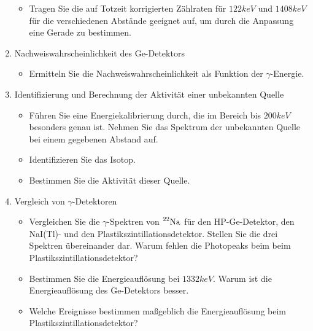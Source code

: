 \begin{enumerate}
\begin{itemize}
				\item Tragen Sie die auf Totzeit korrigierten Zählraten für $122\unit{keV}$ und $1408\unit{keV}$ für die verschiedenen Abstände geeignet auf, um durch die Anpassung eine Gerade zu bestimmen.
			\end{itemize}
		\item Nachweiswahrscheinlichkeit des Ge-Detektors
			\begin{itemize}
				\item Ermitteln Sie die Nachweiswahrscheinlichkeit als Funktion der $\gamma$-Energie.
			\end{itemize}
		\item Identifizierung und Berechnung der Aktivität einer unbekannten Quelle
			\begin{itemize}
				\item Führen Sie eine Energiekalibrierung durch, die im Bereich bis $200\unit{keV}$ besonders genau ist.
				Nehmen Sie das Spektrum der unbekannten Quelle bei einem gegebenen Abstand auf.
				\item Identifizieren Sie das Isotop.
				\item Bestimmen Sie die Aktivität dieser Quelle.
			\end{itemize}
		\item Vergleich von $\gamma$-Detektoren
			\begin{itemize}
				\item Vergleichen Sie die $\gamma$-Spektren von $\prescript{22}{}{\mathrm{Na}}$ für den HP-Ge-Detektor, den NaI(Tl)- und den Plastikszintillationsdetektor.
				Stellen Sie die drei Spektren übereinander dar.
				Warum fehlen die Photopeaks beim beim Plastikszintillationsdetektor?
				\item Bestimmen Sie die Energieauflösung bei $1332\unit{keV}$.
				Warum ist die Energieauflösung des Ge-Detektors besser.
				\item Welche Ereignisse bestimmen maßgeblich die Energieauflösung beim Plastikszintillationsdetektor?
			\end{itemize}
	\end{enumerate}


